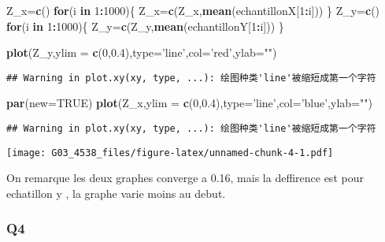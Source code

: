 \documentclass[]{article}
\newenvironment{Shaded}{\begin{snugshade}}{\end{snugshade}}
\newcommand{\KeywordTok}[1]{\textcolor[rgb]{0.13,0.29,0.53}{\textbf{#1}}}
\newcommand{\DataTypeTok}[1]{\textcolor[rgb]{0.13,0.29,0.53}{#1}}
\newcommand{\DecValTok}[1]{\textcolor[rgb]{0.00,0.00,0.81}{#1}}
\newcommand{\FloatTok}[1]{\textcolor[rgb]{0.00,0.00,0.81}{#1}}
\newcommand{\StringTok}[1]{\textcolor[rgb]{0.31,0.60,0.02}{#1}}
\newcommand{\OtherTok}[1]{\textcolor[rgb]{0.56,0.35,0.01}{#1}}
\newcommand{\ControlFlowTok}[1]{\textcolor[rgb]{0.13,0.29,0.53}{\textbf{#1}}}
\newcommand{\OperatorTok}[1]{\textcolor[rgb]{0.81,0.36,0.00}{\textbf{#1}}}
\newcommand{\NormalTok}[1]{#1}
\begin{document}
\begin{Shaded}
\begin{Highlighting}[]
\NormalTok{Z_x=}\KeywordTok{c}\NormalTok{()}
\ControlFlowTok{for}\NormalTok{(i }\ControlFlowTok{in} \DecValTok{1}\OperatorTok{:}\DecValTok{1000}\NormalTok{)\{}
\NormalTok{  Z_x=}\KeywordTok{c}\NormalTok{(Z_x,}\KeywordTok{mean}\NormalTok{(echantillonX[}\DecValTok{1}\OperatorTok{:}\NormalTok{i]))}
\NormalTok{\}}
\NormalTok{Z_y=}\KeywordTok{c}\NormalTok{()}
\ControlFlowTok{for}\NormalTok{(i }\ControlFlowTok{in} \DecValTok{1}\OperatorTok{:}\DecValTok{1000}\NormalTok{)\{}
\NormalTok{  Z_y=}\KeywordTok{c}\NormalTok{(Z_y,}\KeywordTok{mean}\NormalTok{(echantillonY[}\DecValTok{1}\OperatorTok{:}\NormalTok{i]))}
\NormalTok{\}}


\KeywordTok{plot}\NormalTok{(Z_y,}\DataTypeTok{ylim =} \KeywordTok{c}\NormalTok{(}\DecValTok{0}\NormalTok{,}\FloatTok{0.4}\NormalTok{),}\DataTypeTok{type=}\StringTok{'line'}\NormalTok{,}\DataTypeTok{col=}\StringTok{'red'}\NormalTok{,}\DataTypeTok{ylab=}\StringTok{""}\NormalTok{)}
\end{Highlighting}
\end{Shaded}

\begin{verbatim}
## Warning in plot.xy(xy, type, ...): 绘图种类'line'被缩短成第一个字符
\end{verbatim}

\begin{Shaded}
\begin{Highlighting}[]
\KeywordTok{par}\NormalTok{(}\DataTypeTok{new=}\OtherTok{TRUE}\NormalTok{) }
\KeywordTok{plot}\NormalTok{(Z_x,}\DataTypeTok{ylim =} \KeywordTok{c}\NormalTok{(}\DecValTok{0}\NormalTok{,}\FloatTok{0.4}\NormalTok{),}\DataTypeTok{type=}\StringTok{'line'}\NormalTok{,}\DataTypeTok{col=}\StringTok{'blue'}\NormalTok{,}\DataTypeTok{ylab=}\StringTok{""}\NormalTok{)}
\end{Highlighting}
\end{Shaded}

\begin{verbatim}
## Warning in plot.xy(xy, type, ...): 绘图种类'line'被缩短成第一个字符
\end{verbatim}

\texttt{[image: G03\_4538\_files/figure-latex/unnamed-chunk-4-1.pdf]}

On remarque les deux graphes converge a 0.16, mais la deffirence est
pour echatillon y , la graphe varie moins au debut.

\subsubsection{Q4}\label{q4}
\end{document}
